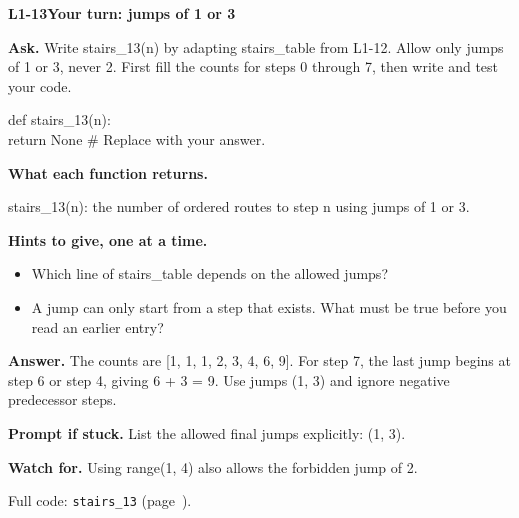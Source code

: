 \documentclass[11pt,a4paper]{article}
\begin{document}
\noindent\begin{minipage}{\textwidth}
{\color{teal}\textbf{L1-13}}\quad \textbf{Your turn: jumps of 1 or 3}\par\smallskip
\textbf{Ask.} Write stairs\_13(n) by adapting stairs\_table from L1-12. Allow only jumps of 1 or 3, never 2. First fill the counts for steps 0 through 7, then write and test your code.\par\smallskip
\par{}\par\smallskip\noindent\colorbox{codepaper}{\parbox{\dimexpr\linewidth-2\fboxsep\relax}{\small\ttfamily\raggedright def stairs\_13(n):\\\hspace*{2.4em}return None  \# Replace with your answer.}}\par
{\small\textbf{What each function returns.}\par stairs\_13(n): the number of ordered routes to step n using jumps of 1 or 3.\par }
{\small\textbf{Hints to give, one at a time.}}\begin{itemize}\item Which line of stairs\_table depends on the allowed jumps?\item A jump can only start from a step that exists. What must be true before you read an earlier entry?\end{itemize}
\textbf{Answer.} The counts are [1, 1, 1, 2, 3, 4, 6, 9]. For step 7, the last jump begins at step 6 or step 4, giving 6 + 3 = 9. Use jumps (1, 3) and ignore negative predecessor steps.\par\smallskip
\textbf{Prompt if stuck.} List the allowed final jumps explicitly: (1, 3).\par\smallskip
\textbf{Watch for.} Using range(1, 4) also allows the forbidden jump of 2.\par\smallskip Full code: \texttt{stairs\_13} (page~\pageref{L1-code-stairs_13}).
\end{minipage}\par{}\medskip
\end{document}
